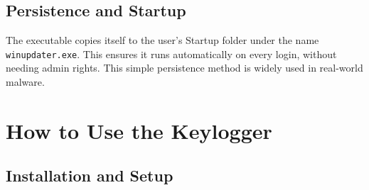 \subsection{Persistence and Startup}
The executable copies itself to the user's Startup folder under the name \texttt{winupdater.exe}. This ensures it runs automatically on every login, without needing admin rights. This simple persistence method is widely used in real-world malware.

\section{How to Use the Keylogger}

\subsection{Installation and Setup}

